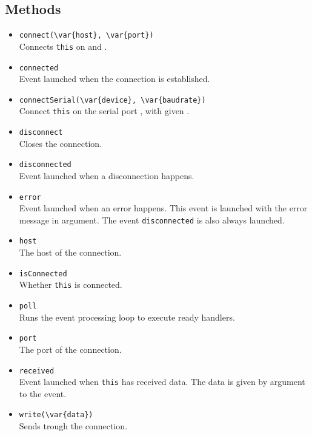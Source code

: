 \subsection{Methods}
\begin{itemize}

\item \lstinline|connect(\var{host}, \var{port})|\\
  Connects \lstinline|this| on  and .

\item \lstinline|connected|\\
  Event launched when the connection is established.

\item \lstinline|connectSerial(\var{device}, \var{baudrate})|\\
  Connect \lstinline|this| on the serial port , with given
  .

\item \lstinline|disconnect|\\
  Closes the connection.

\item \lstinline|disconnected|\\
  Event launched when a disconnection happens.

\item \lstinline|error|\\
  Event launched when an error happens. This event is launched with
  the error message in argument. The event \lstinline|disconnected| is
  also always launched.

\item \lstinline|host|\\
  The host of the connection.

\item \lstinline|isConnected|\\
  Whether \lstinline|this| is connected.

\item \lstinline|poll|\\
  Runs the event processing loop to execute ready handlers.

\item \lstinline|port|\\
  The port of the connection.

\item \lstinline|received|\\
  Event launched when \lstinline|this| has received data. The data is
  given by argument to the event.

\item \lstinline|write(\var{data})|\\
  Sends  trough the connection.

\end{itemize}
